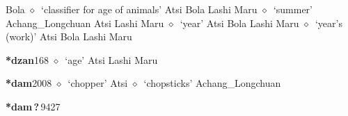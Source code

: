 \begin{list}{}{\leftmargin=1.5em \itemindent=-1.5em}
         Bola 
\hspace{1ex}
         $\diamond$~`classifier for age of animals'
         Atsi 
\hspace{1ex}
         Bola 
\hspace{1ex}
         Lashi 
\hspace{1ex}
         Maru 
\hspace{1ex}
         $\diamond$~`summer'
         Achang\_Longchuan 
\hspace{1ex}
         Atsi 
\hspace{1ex}
         Lashi 
\hspace{1ex}
         Maru 
\hspace{1ex}
         $\diamond$~`year'
         Atsi 
\hspace{1ex}
         Bola 
\hspace{1ex}
         Lashi 
\hspace{1ex}
         Maru 
\hspace{1ex}
         $\diamond$~`year's (work)'
         Atsi 
\hspace{1ex}
         Bola 
\hspace{1ex}
         Lashi 
\hspace{1ex}
         Maru 
  \item {\footnotesize \textbf{*dzan}}{\tiny 168}
\hspace{1ex}
         $\diamond$~`age'
         Atsi 
\hspace{1ex}
         Lashi 
\hspace{1ex}
         Maru 
  \item {\footnotesize \textbf{*dam}}{\tiny 2008}
\hspace{1ex}
         $\diamond$~`chopper'
         Atsi 
\hspace{1ex}
         $\diamond$~`chopsticks'
         Achang\_Longchuan 
  \item {\footnotesize \textbf{*dam\,?\,}}{\tiny 9427}

\end{list}
